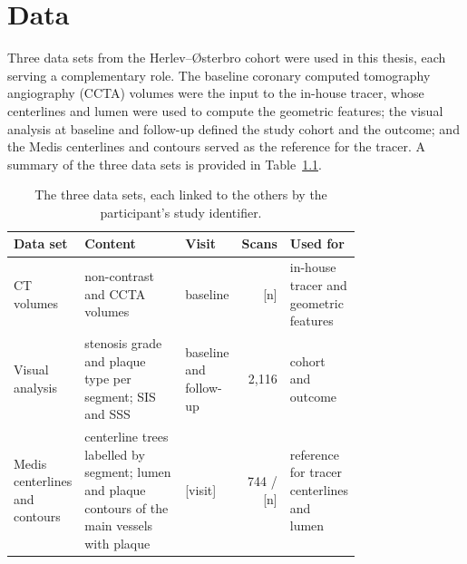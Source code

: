 \providecommand{\clarify}[1]{\textcolor{red}{\textbf{Clarification needed:} #1}}

\chapter{Data}
\label{ch:data}

Three data sets from the Herlev--{\O}sterbro cohort were used in this thesis, each serving a complementary role.
The baseline coronary computed tomography angiography (CCTA) volumes were the input to the in-house tracer, whose centerlines and lumen were used to compute the geometric features; the visual analysis at baseline and follow-up defined the study cohort and the outcome; and the Medis centerlines and contours served as the reference for the tracer.
A summary of the three data sets is provided in Table~\ref{tab:data-overview}.

\begin{table}[htbp]
  \centering
  \caption{The three data sets, each linked to the others by the participant's study identifier.}
  \label{tab:data-overview}
  \small
  \begin{tabular}{p{0.16\linewidth}p{0.3\linewidth}p{0.12\linewidth}rp{0.18\linewidth}}
    \toprule
    Data set & Content & Visit & Scans & Used for \\
    \midrule
    CT volumes & non-contrast and CCTA volumes & baseline & [n] & in-house tracer and geometric features \\
    Visual analysis & stenosis grade and plaque type per segment; SIS and SSS & baseline and follow-up & 2,116 & cohort and outcome \\
    Medis centerlines and contours & centerline trees labelled by segment; lumen and plaque contours of the main vessels with plaque & [visit] & 744 / [n] & reference for tracer centerlines and lumen \\
    \bottomrule
  \end{tabular}
\end{table}
